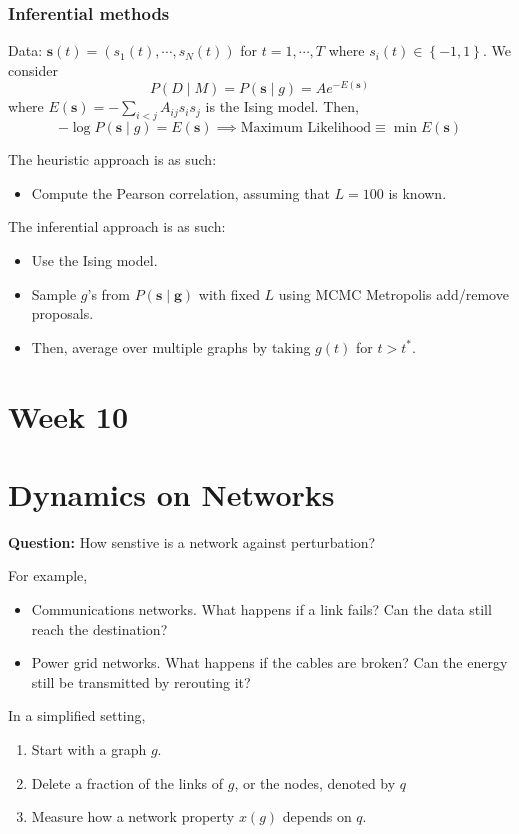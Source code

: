 \documentclass[12pt]{article}
\theoremstyle{definition}
\newcommand{\B}[1]{\boldsymbol{\boldsymbol{#1}}}
\newcommand{\br}[1]{\left({#1}\right)}
\newcommand{\cur}[1]{\left\{{#1}\right\}}
\begin{document}
\subsubsection{Inferential methods}
Data: $\B{s}(t) =\br{s_1(t),\cdots,s_N(t)}$ for $t=1,\cdots, T$ where $s_i(t)\in\cur{-1,1}$. We consider
\[
P(D\mid M)=P(\B{s}\mid g)=Ae^{-E(\B{s})}
\]
where $E(\B{s})=-\sum_{i<j}A_{ij}s_is_j$ is the Ising model. Then, 
\[
-\log P(\B{s}\mid g) = E(\B{s})\implies \text{Maximum Likelihood}\equiv\min E(\B{s})
\]

The heuristic approach is as such: 
\begin{itemize}
    \item Compute the Pearson correlation, assuming that $L=100$ is known. 
\end{itemize}
The inferential approach is as such: 
\begin{itemize}
    \item Use the Ising model. 
    \item Sample $g$'s from $P(\B{s}\mid \B{g})$ with fixed $L$ using MCMC Metropolis add/remove proposals. 
    \item Then, average over multiple graphs by taking $g(t)$ for $t>t^*$. 
\end{itemize}



\newpage
\section*{Week 10}

\section{Dynamics on Networks}

\textbf{Question:} How senstive is a network against perturbation?

For example,
\begin{itemize}
    \item Communications networks. What happens if a link fails? Can the data still reach the destination?
    \item Power grid networks. What happens if the cables are broken? Can the energy still be transmitted by rerouting it?
\end{itemize}

In a simplified setting, 
\begin{enumerate}
    \item Start with a graph $g$. 
    \item Delete a fraction of the links of $g$, or the nodes, denoted by $q$ 
    \item Measure how a network property $x(g)$ depends on $q$.
\end{enumerate}
\end{document}

